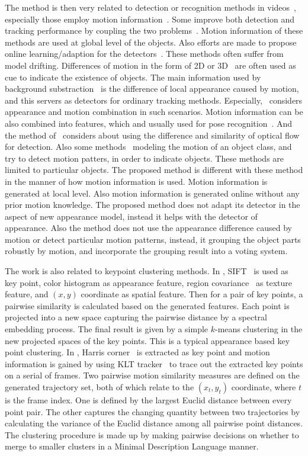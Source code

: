 The method is then very related to detection or recognition methods in videos~\citep{vd4,vd5,vd6,mtvvv,hogfl}, especially those employ motion information~\citep{vd1,vd2,vd3}. Some  improve both detection and tracking performance by coupling the two problems~\citep{vd1,vd2,vd3}. Motion information of these methods are used at global level of the objects. Also efforts are made to propose online learning/adaption for the detectors~\citep{vd4,vd5,vd6,dldt}. These methods often suffer from model drifting. Differences of motion in the form of 2D or 3D~\citep{my3} are often used as cue to indicate the existence of objects. The main information used by background substraction~\citep{bs1} is the difference of local appearance caused by motion, and this servers as detectors for ordinary tracking methods. Especially,~\citep{pvm} considers appearance and motion combination in such scenarios. Motion information can be also combined into features, which and  usually used for pose recognition~\citep{mafea}.  And the method of~\citep{my9} considers about using the difference and similarity of optical flow for detection. Also some methods~\citep{maaa} modeling the motion of an object class, and try to detect motion patters, in order to indicate objects. These methods are limited to particular objects. The proposed method is different with these method in the manner of how motion information is used. Motion information is generated at local level. Also motion information is generated online without any prior motion knowledge. The proposed method does not adapt its detector in the aspect of new appearance model, instead it helps with the detector of appearance. Also the method does not use the appearance difference caused by motion or detect particular motion patterns, instead, it grouping the object parts robustly by motion, and incorporate the grouping result into a voting system.

The work is also related to keypoint clustering methods. In \citep{mc}, SIFT~\citep{o12} is
used as key point, color histogram as appearance feature, region covariance~\citep{regionc}
as texture feature, and $(x,y)$ coordinate as spatial feature. Then
for a pair of key points, a pairwise similarity is calculated based
on the generated features. Each point is projected into a new space
capturing the pairwise distance by a spectral embedding process. The
final result is given by a simple $k$-means clustering in the new
projected spaces of the key points. This is a typical
appearance based key point clustering. In \citep{my9}, Harris
corner~\citep{ij2} is extracted as key point and motion information is
gained by using KLT tracker~\citep{ij3} to trace out the extracted key
points on a serial of frames. Two pairwise motion similarity
measures are defined on the generated trajectory set, both of which
relate to the $(x_t,y_t)$ coordinate, where $t$ is the frame index.
One is defined by the largest Euclid distance between every point
pair. The other captures the changing quantity between two
trajectories by calculating the variance of the Euclid distance
among all pairwise point distances. The clustering procedure is made
up by making pairwise decisions on whether to merge to smaller
clusters in a Minimal Description Language manner.

